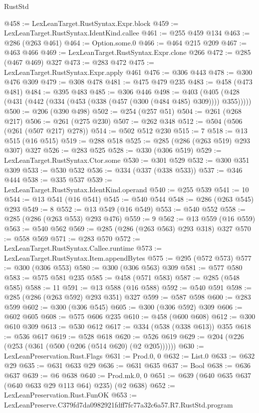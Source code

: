 \begin{lexlean}{RustStd}
\begin{coremodule}
@458 := LexLeanTarget.RustSyntax.Expr.block
@459 := LexLeanTarget.RustSyntax.IdentKind.callee
@461 := @255 @459 @134
@463 := @286 (@263 @461)
@464 := Option.some.{0}
@466 := @464 @215 @209
@467 := @463 @466
@469 := LexLeanTarget.RustSyntax.Expr.clone @266
@472 := @285 (@467 @469) @327
@473 := @283 @472
@475 := LexLeanTarget.RustSyntax.Expr.apply @461
@476 := @306 @443
@478 := @300 @476 @309
@479 := @308 @478
@481 := @475 @479 @235
@483 := @458 (@473 @481)
@484 := @395 @483
@485 := @306 @446
@498 := @403 (@405 (@428 (@431 (@442 (@334 (@453 (@338 (@457 (@300 (@484 @485) @309)))) @355)))))
@500 := @206 (@390 @498)
@502 := @254 (@257 @51)
@504 := @261 (@268 @217)
@506 := @261 (@275 @230)
@507 := @262 @348
@512 := @504 (@506 (@261 (@507 @217) @278))
@514 := @502 @512 @230
@515 := 7
@518 := @13 @515 (@16 @515)
@519 := @288 @518
@525 := @285 (@286 (@263 @519) @293 @307) @327
@526 := @283 @525
@528 := @330 (@306 @519)
@529 := LexLeanTarget.RustSyntax.Ctor.some
@530 := @301 @529
@532 := @300 @351 @309
@533 := @530 @532
@536 := @334 (@337 (@338 @533))
@537 := @346 @444
@538 := @335 @537
@539 := LexLeanTarget.RustSyntax.IdentKind.operand
@540 := @255 @539
@541 := 10
@544 := @13 @541 (@16 @541)
@545 := @540 @544
@548 := @286 (@263 @545) @293
@549 := 8
@552 := @13 @549 (@16 @549)
@553 := @540 @552
@558 := @285 (@286 (@263 @553) @293 @476)
@559 := 9
@562 := @13 @559 (@16 @559)
@563 := @540 @562
@569 := @285 (@286 (@263 @563) @293 @318) @327
@570 := @558 @569
@571 := @283 @570
@572 := LexLeanTarget.RustSyntax.Callee.runtime
@573 := LexLeanTarget.RustSyntax.Item.appendBytes
@575 := @295 (@572 @573)
@577 := @300 (@306 @553)
@580 := @300 (@306 @563) @309
@581 := @577 @580
@583 := @575 @581 @235
@585 := @458 (@571 @583)
@587 := @285 (@548 @585)
@588 := 11
@591 := @13 @588 (@16 @588)
@592 := @540 @591
@598 := @285 (@286 (@263 @592) @293 @351) @327
@599 := @587 @598
@600 := @283 @599
@602 := @300 (@306 @545)
@605 := @300 (@306 @592) @309
@606 := @602 @605
@608 := @575 @606 @235
@610 := @458 (@600 @608)
@612 := @300 @610 @309
@613 := @530 @612
@617 := @334 (@538 (@338 @613)) @355
@618 := @536 @617
@619 := @528 @618
@620 := @526 @619
@629 := @204 (@226 (@253 (@361 (@500 (@206 (@514 @620) (@2 @205))))))
@630 := LexLeanPreservation.Rust.Flags
@631 := Prod.{0, 0}
@632 := List.{0}
@633 := @632 @29
@635 := @631 @633 @29
@636 := @631 @635
@637 := Bool
@638 := @636 @637
@639 := @6 @638
@640 := Prod.mk.{0, 0}
@651 := @639 (@640 @635 @637 (@640 @633 @29 @113 @64) @235) (@2 @638)
@652 := LexLeanPreservation.Rust.FunOK
@653 := LexLeanPreserve.C379fd7da0982921fdff7fc77a32c6a57.R7.RustStd.program

\end{coremodule}
\end{lexlean}
